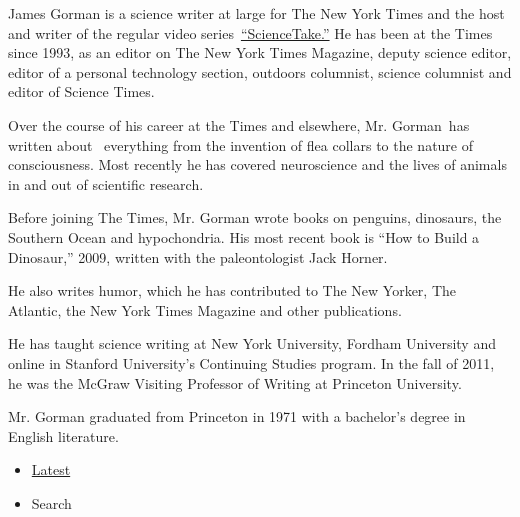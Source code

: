 James Gorman is a science writer at large for The New York Times and the
host and writer of the regular video
series~\href{https://www.nytimes.com/video/sciencetake}{``ScienceTake.''}
He has been at the Times since 1993, as an editor on The New York Times
Magazine, deputy science editor, editor of a personal technology
section, outdoors columnist, science columnist and editor of Science
Times.

Over the course of his career at the Times and elsewhere, Mr. Gorman~has
written about ~everything from the invention of flea collars to the
nature of consciousness. Most recently he has covered neuroscience and
the lives of animals in and out of scientific research.

Before joining The Times, Mr. Gorman wrote books on penguins, dinosaurs,
the Southern Ocean and hypochondria. His most recent book is ``How to
Build a Dinosaur,'' 2009, written with the paleontologist Jack Horner.

He also writes humor, which he has contributed to The New Yorker, The
Atlantic, the New York Times Magazine and other publications.

He has taught science writing at New York University, Fordham University
and online in Stanford University's Continuing Studies program. In the
fall of 2011, he was the McGraw Visiting Professor of Writing at
Princeton University.

Mr. Gorman graduated from Princeton in 1971 with a bachelor's degree in
English literature.

\begin{itemize}
\tightlist
\item
  \protect\hyperlink{stream-panel}{Latest}
\item
  Search
\end{itemize}

